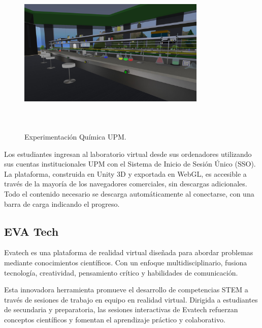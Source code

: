 \begin{figure}[thbp]
    \centering
    \includegraphics[width=0.8\textwidth, height=8cm]{img/chapter01/UPM.jpg}
    \caption{Experimentación Química UPM.}\label{fig:Esquema}
\end{figure}

Los estudiantes ingresan al laboratorio virtual desde sus ordenadores utilizando sus cuentas institucionales UPM con el Sistema de Inicio de Sesión Único (SSO). La plataforma, construida en Unity 3D y exportada en WebGL, es accesible a través de la mayoría de los navegadores comerciales, sin descargas adicionales. Todo el contenido necesario se descarga automáticamente al conectarse, con una barra de carga indicando el progreso.

\newpage
\subsection{EVA Tech}

Evatech es una plataforma de realidad virtual diseñada para abordar problemas mediante conocimientos científicos. Con un enfoque multidisciplinario, fusiona tecnología, creatividad, pensamiento crítico y habilidades de comunicación.

Esta innovadora herramienta promueve el desarrollo de competencias STEM a través de sesiones de trabajo en equipo en realidad virtual. Dirigida a estudiantes de secundaria y preparatoria, las sesiones interactivas de Evatech refuerzan conceptos científicos y fomentan el aprendizaje práctico y colaborativo.

